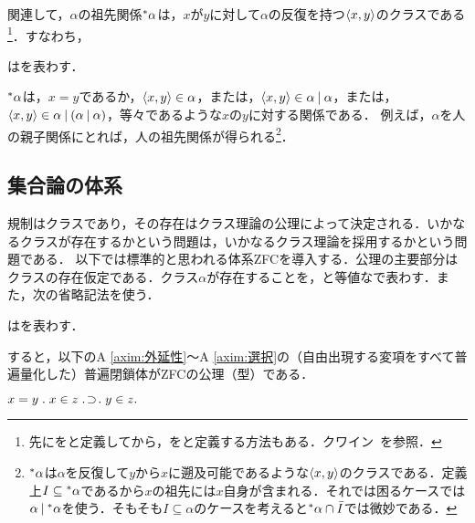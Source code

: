 関連して，$\alpha$の祖先関係$\ance{\alpha}$は，$x$が$y$に対して$\alpha$の反復を持つ$\langle x,y \rangle$のクラスである\footnote{
    先に\kagi{$ \ance{\alpha} $}をと定義してから，をと定義する方法もある．クワイン~\cite[pp.\,93--95]{クワインa}を参照．
}．すなわち，

\begin{df}
\label{df:祖先関係}
\kagi{$
    \ance{\alpha}
$}はを表わす．
\end{df}

\noindent $\ance{\alpha}$は，$x=y$であるか，$\langle x,y \rangle\in\alpha$，または，$\langle x,y \rangle\in\alpha\mathbin{\mid}\alpha$，または，$\langle x,y \rangle\in\alpha\mathbin{\mid}(\alpha\mathbin{\mid}\alpha)$，等々であるような$x$の$y$に対する関係である．
例えば，$\alpha$を人の親子関係にとれば，人の祖先関係が得られる\footnote{
$\ance{\alpha}$は$\alpha$を反復して$y$から$x$に遡及可能であるような$\langle x,y \rangle$のクラスである．定義上$ I\subseteq{^*}\alpha $であるから$x$の祖先には$x$自身が含まれる．それでは困るケースでは$\alpha\mathbin{\mid}{^*}\alpha$を使う．そもそも$I\subseteq\alpha$のケースを考えると${^*}\alpha\cap\bar{I}$では微妙である．}．

\subsection{集合論の体系}
\label{ssec:集合論の体系}

規制はクラスであり，その存在はクラス理論の公理によって決定される．いかなるクラスが存在するかという問題は，いかなるクラス理論を採用するかという問題である．
以下では標準的と思われる体系ZFCを導入する．公理の主要部分はクラスの存在仮定である．クラス$\alpha$が存在することを，と等値な\kagi{$ \alpha\in\univ $}で表わす．また，次の省略記法を使う．
\begin{df}[冪集合]
\label{df:冪集合}
はを表わす．
\end{df}

\noindent すると，以下のA \ref{axim:外延性}〜A \ref{axim:選択}の（自由出現する変項をすべて普遍量化した）普遍閉鎖体がZFCの公理（型）である．

\begin{axim}[外延性]
\label{axim:外延性}
$
    x=y\con{1}x\in z\case{1}{1}{1}y\in z.
$
\end{axim}

